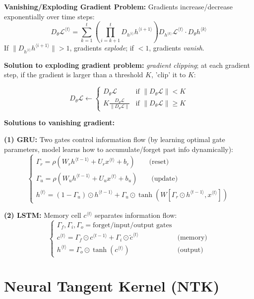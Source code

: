 \documentclass[a4paper,10pt]{article}
\begin{document}
\begin{small}
\textbf{Vanishing/Exploding Gradient Problem:} Gradients increase/decrease exponentially over time steps:
$$
D_{\theta} \mathcal{L}^{\langle t \rangle} = \sum_{k=1}^{t} \left( \prod_{i=k+1}^{t} D_{h^{\langle i \rangle}} h^{\langle i+1 \rangle} \right) D_{h^{\langle k \rangle}} \mathcal{L}^{\langle t \rangle} \cdot D_{\theta} h^{\langle k \rangle}
$$
If $ \| D_{h^{\langle i \rangle}} h^{\langle i+1 \rangle} \| > 1 $, gradients \textit{explode}; if $ < 1 $, gradients \textit{vanish}.

\textbf{Solution to exploding gradient problem:} \textit{gradient clipping}; at each gradient step, if the gradient is larger than a threshold $K$, 'clip' it to $K$:

$$
D_\theta \mathcal{L} \leftarrow 
\begin{cases} 
D_\theta \mathcal{L} & \text{if } \|D_\theta \mathcal{L}\| < K \\ 
K \frac{D_\theta \mathcal{L}}{\|D_\theta \mathcal{L}\|} & \text{if } \|D_\theta \mathcal{L}\| \geq K 
\end{cases}
$$

\textbf{Solutions to vanishing gradient:}

\textbf{(1) GRU:} Two gates control information flow (by learning optimal gate parameters, model learns how to accumulate/forget past info dynamically):
$$\begin{cases}
\Gamma_r = \rho(W_r h^{\langle t-1 \rangle} + U_r x^{\langle t \rangle} + b_r)  \quad \quad \text{(reset)} \\
\Gamma_u = \rho(W_u h^{\langle t-1 \rangle} + U_u x^{\langle t \rangle} + b_u) \quad \quad \text{(update)} \\
h^{\langle t \rangle} = (1-\Gamma_u) \odot h^{\langle t-1 \rangle} + \Gamma_u \odot \tanh(W[\Gamma_r \odot h^{\langle t-1 \rangle}, x^{\langle t \rangle}])
\end{cases}$$

\textbf{(2) LSTM:} Memory cell $c^{\langle t \rangle}$ separates information flow:
$$\begin{cases}
\Gamma_f, \Gamma_i, \Gamma_o = \text{forget/input/output gates} \\
c^{\langle t \rangle} = \Gamma_f \odot c^{\langle t-1 \rangle} + \Gamma_i \odot \tilde{c}^{\langle t \rangle} & \text{(memory)} \\
h^{\langle t \rangle} = \Gamma_o \odot \tanh(c^{\langle t \rangle}) & \text{(output)}
\end{cases}$$

\section{Neural Tangent Kernel (NTK)}


\end{small}
\end{document}
